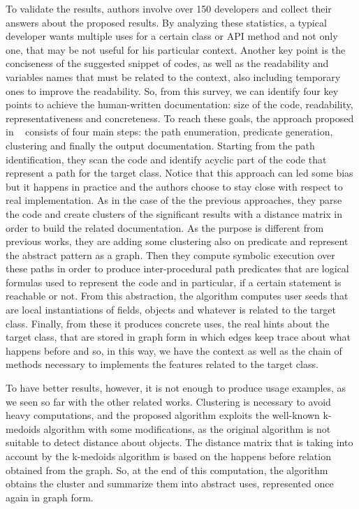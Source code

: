 To validate the results, authors involve 
over 150 developers and collect their 
answers about the proposed results. By 
analyzing these statistics, a typical 
developer wants multiple uses for a certain 
class or API method and not only 
one, that may be not useful for his 
particular context. Another key point is 
the conciseness of the suggested snippet of 
codes, as well as the readability 
and variables names that must be related to 
the context, also including 
temporary ones to improve the readability. 
So, from this survey, we can 
identify four key points to achieve the 
human-written documentation: size of 
the code, readability, representativeness 
and concreteness. 
To reach these goals, the approach proposed 
in ~\cite{buse_synthesizing_2012} 
consists of four main steps: the path 
enumeration, predicate generation, 
clustering and finally the output 
documentation. Starting from the path 
identification, they scan the code and 
identify acyclic part of the code that 
represent a path for the target class. 
Notice that this approach can led some 
bias but it happens in practice and the 
authors choose to stay close with 
respect to real implementation. As in the 
case of the the previous approaches, 
they parse the code and create clusters of 
the significant results with a 
distance matrix in order to build the 
related documentation. As the purpose is 
different from previous works, they are 
adding some clustering also on 
predicate and represent the abstract 
pattern as a graph. Then they compute 
symbolic execution over these paths in 
order to produce inter-procedural path 
predicates that are logical formulas used 
to represent the code and in 
particular, if a certain statement is 
reachable or not. From this abstraction, 
the algorithm computes user seeds that are 
local instantiations of fields, 
objects and whatever is related to the 
target class. Finally, from these it 
produces concrete uses, the real hints 
about the target class, that are stored 
in graph form in which edges keep trace 
about what happens before and so, in 
this way, we have the context as well as 
the chain of methods necessary to 
implements the features related to the 
target class. 

To have better results, however, it is not 
enough to produce usage examples, as 
we seen so far with the other related 
works. Clustering is necessary to avoid 
heavy computations, and the proposed 
algorithm exploits the well-known 
k-medoids algorithm with some 
modifications, as the original algorithm is 
not 
suitable to detect distance about objects. 
The distance matrix that is taking 
into account by the k-medoids algorithm is 
based on the happens before relation 
obtained from the graph. So, at the end of 
this computation, the algorithm 
obtains the cluster and summarize them into 
abstract uses, represented once 
again in graph form. 

